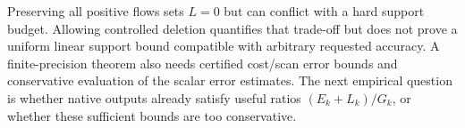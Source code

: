 \documentclass[11pt]{article}
\begin{document}
Preserving all positive flows sets $L=0$ but can conflict with a hard support budget.
Allowing controlled deletion quantifies that trade-off but does not prove a uniform linear support bound compatible with arbitrary requested accuracy.
A finite-precision theorem also needs certified cost/scan error bounds and conservative evaluation of the scalar error estimates.
The next empirical question is whether native outputs already satisfy useful ratios $(E_k+L_k)/G_k$, or whether these sufficient bounds are too conservative.
\end{document}
